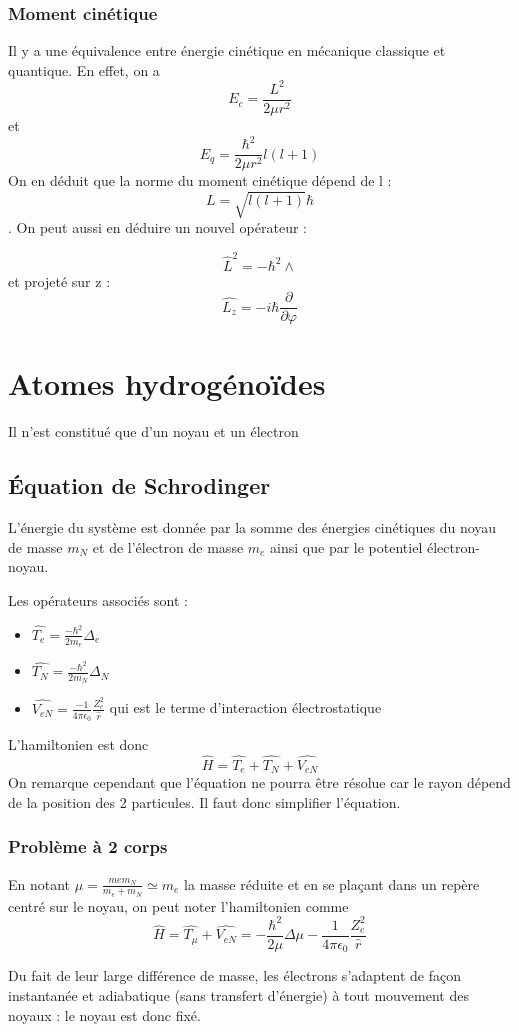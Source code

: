 \documentclass[french]{yLectureNote}
\newcommand{\HH}{\hat{H}}
\newcommand{\hb}{\hbar}
\begin{document}
\subsubsection{Moment cinétique}
Il y a une équivalence entre énergie cinétique en mécanique classique et quantique. En effet, on a
 \[E_c = \frac{L^2}{2\mu r^2}\]
 et \[E_q = \frac{\hb^2}{2\mu r^2}l(l+1)\]
On en déduit que la norme du moment cinétique dépend de l : \[L = \sqrt{l(l+1)}\hb\]. On peut aussi en déduire un nouvel opérateur :
\begin{definition}
\[\hat{L}^2 = -\hb^2\wedge\] et projeté sur z : \[\hat{L_z} = -i\hb \frac{\partial}{\partial \varphi}\]
\end{definition}
\section{Atomes hydrogénoïdes}
\begin{definition}
Il n'est constitué que d'un noyau et un électron
\end{definition}
\subsection{Équation de Schrodinger}
L'énergie du système est donnée par la somme des énergies cinétiques du noyau de masse \(m_N\) et de l'électron de masse \(m_e\) ainsi que par le potentiel électron-noyau.

Les opérateurs associés sont :
\begin{itemize}
 \item \(\hat{T_e} = \frac{-\hb^2}{2m_e}\Delta_e\)
 \item \(\hat{T_N} = \frac{-\hb^2}{2m_N}\Delta_N\)
\item \(\hat{V_{eN}} = \frac{-1}{4\pi\epsilon_0}\frac{Z_e^2}{\hat{r}}\) qui est le terme d’interaction électrostatique
\end{itemize}
L'hamiltonien est donc \[\HH = \hat{T_e} + \hat{T_N}+\hat{V_{eN}}\] On remarque cependant que l'équation ne pourra \^etre résolue car le rayon dépend de la position des 2 particules. Il faut donc simplifier l'équation.
\subsubsection{Problème à 2 corps}
En notant \(\mu = \frac{mem_N}{m_e+m_N} \simeq m_e\) la masse réduite et en se plaçant dans un repère centré sur le noyau, on peut noter l'hamiltonien comme \[\HH = \hat{T_{\mu}} + \hat{V_{eN}} = -\frac{\hb^2}{2\mu}\Delta \mu - \frac{1}{4\pi \epsilon_0}\frac{Z_e^2}{\hat{r}}\]
\begin{theorem}
Du fait de leur large différence de masse, les électrons s'adaptent de façon instantanée et adiabatique (sans transfert d'énergie) à tout mouvement des noyaux : le noyau est donc fixé.
\end{theorem}
\end{document}
